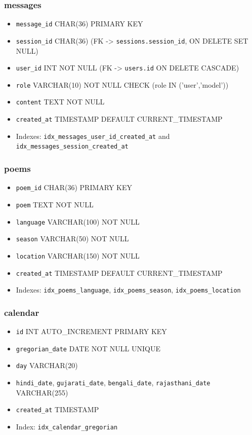 \documentclass[11pt]{article}
\begin{document}
\subsubsection*{messages}
\begin{itemize}
  \item \texttt{message\_id} CHAR(36) PRIMARY KEY
  \item \texttt{session\_id} CHAR(36) (FK -> \texttt{sessions.session\_id}, ON DELETE SET NULL)
  \item \texttt{user\_id} INT NOT NULL (FK -> \texttt{users.id} ON DELETE CASCADE)
  \item \texttt{role} VARCHAR(10) NOT NULL CHECK (role IN ('user','model'))
  \item \texttt{content} TEXT NOT NULL
  \item \texttt{created\_at} TIMESTAMP DEFAULT CURRENT\_TIMESTAMP
  \item Indexes: \texttt{idx\_messages\_user\_id\_created\_at} and \texttt{idx\_messages\_session\_created\_at}
\end{itemize}

\subsubsection*{poems}
\begin{itemize}
  \item \texttt{poem\_id} CHAR(36) PRIMARY KEY
  \item \texttt{poem} TEXT NOT NULL
  \item \texttt{language} VARCHAR(100) NOT NULL
  \item \texttt{season} VARCHAR(50) NOT NULL
  \item \texttt{location} VARCHAR(150) NOT NULL
  \item \texttt{created\_at} TIMESTAMP DEFAULT CURRENT\_TIMESTAMP
  \item Indexes: \texttt{idx\_poems\_language}, \texttt{idx\_poems\_season}, \texttt{idx\_poems\_location}
\end{itemize}

\subsubsection*{calendar}
\begin{itemize}
  \item \texttt{id} INT AUTO\_INCREMENT PRIMARY KEY
  \item \texttt{gregorian\_date} DATE NOT NULL UNIQUE
  \item \texttt{day} VARCHAR(20)
  \item \texttt{hindi\_date}, \texttt{gujarati\_date}, \texttt{bengali\_date}, \texttt{rajasthani\_date} VARCHAR(255)
  \item \texttt{created\_at} TIMESTAMP
  \item Index: \texttt{idx\_calendar\_gregorian}
\end{itemize}
\end{document}
